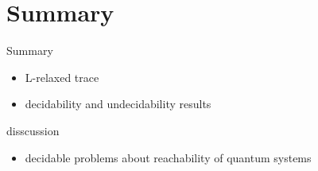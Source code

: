 \section{Summary}
\begin{frame}{Summary}
  \begin{itemize}
    \item L-relaxed trace
    \item decidability and undecidability results
  \end{itemize}
\end{frame}
\begin{frame}{disscussion}
  \begin{itemize}
    \item decidable problems about reachability of quantum systems
  \end{itemize}
\end{frame}